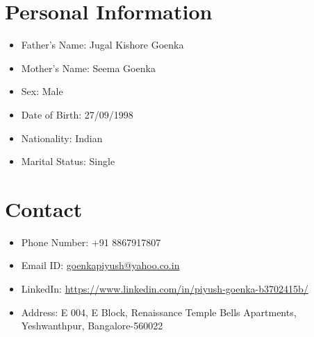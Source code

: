 \documentclass[12pt,a4paper,sans]{moderncv} %
\begin{document}
\section{Personal Information}

\begin{itemize}
	
	
	\item Father's Name: Jugal Kishore Goenka
	\item Mother's Name: Seema Goenka
	\item Sex: Male
	\item Date of Birth: 27/09/1998
	\item Nationality: Indian
	\item Marital Status: Single
\end{itemize}



\section{Contact}
\begin{itemize}
	\item Phone Number: +91 8867917807
	\item Email ID: \url{goenkapiyush@yahoo.co.in}
	\item LinkedIn: \url{https://www.linkedin.com/in/piyush-goenka-b3702415b/}
	\item Address: E 004, E Block, Renaissance Temple Bells Apartments, Yeshwanthpur, Bangalore-560022
	
\end{itemize}
\end{document}
